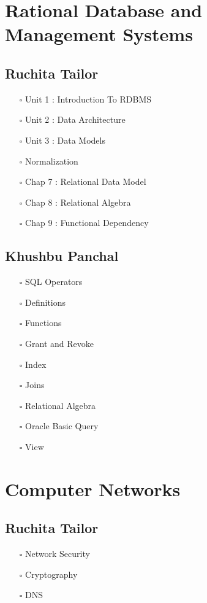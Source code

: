\documentclass[11pt]{article}
\begin{document}
\section{Rational Database and Management Systems}
\label{sec:orgc9bf215}
\subsection{Ruchita Tailor}
\label{sec:org472295a}
\begin{itemize}
\item[{$\square$}] Unit 1 : Introduction To RDBMS
\item[{$\square$}] Unit 2 : Data Architecture
\item[{$\square$}] Unit 3 : Data Models
\item[{$\square$}] Normalization
\item[{$\square$}] Chap 7 : Relational Data Model
\item[{$\square$}] Chap 8 : Relational Algebra
\item[{$\square$}] Chap 9 : Functional Dependency
\end{itemize}

\subsection{Khushbu Panchal}
\label{sec:org3b0094f}
\begin{itemize}
\item[{$\square$}] SQL Operators
\item[{$\square$}] Definitions
\item[{$\square$}] Functions
\item[{$\square$}] Grant and Revoke
\item[{$\square$}] Index
\item[{$\square$}] Joins
\item[{$\square$}] Relational Algebra
\item[{$\square$}] Oracle Basic Query
\item[{$\square$}] View
\end{itemize}

\section{Computer Networks}
\label{sec:org1f17f46}
\subsection{Ruchita Tailor}
\label{sec:org74dbc64}
\begin{itemize}
\item[{$\square$}] Network Security
\item[{$\square$}] Cryptography
\item[{$\square$}] DNS
\end{itemize}
\end{document}
